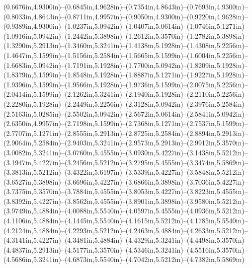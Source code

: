(0.6676in,4.9300in)--(0.6845in,4.9628in)--(0.7354in,4.8643in)--(0.7693in,4.9300in)--(0.8033in,4.8643in)--(0.8711in,4.9957in)--(0.9050in,4.9300in)--(0.9220in,4.9628in)--(0.9389in,4.9300in)--(1.0237in,5.0942in)--(1.0407in,5.0614in)--(1.0746in,5.1271in)--(1.0916in,5.0942in)--(1.2442in,5.3898in)--(1.2612in,5.3570in)--(1.2782in,5.3898in)--(1.3290in,5.2913in)--(1.3460in,5.3241in)--(1.4138in,5.1928in)--(1.4308in,5.2256in)--(1.4647in,5.1599in)--(1.5156in,5.2584in)--(1.5665in,5.1599in)--(1.6004in,5.2256in)--(1.6683in,5.0942in)--(1.7191in,5.1928in)--(1.7700in,5.0942in)--(1.8209in,5.1928in)--(1.8379in,5.1599in)--(1.8548in,5.1928in)--(1.8887in,5.1271in)--(1.9227in,5.1928in)--(1.9396in,5.1599in)--(1.9566in,5.1928in)--(1.9736in,5.1599in)--(2.0075in,5.2256in)--(2.0414in,5.1599in)--(2.1262in,5.3241in)--(2.1940in,5.1928in)--(2.2110in,5.2256in)--(2.2280in,5.1928in)--(2.2449in,5.2256in)--(2.3128in,5.0942in)--(2.3976in,5.2584in)--(2.5163in,5.0285in)--(2.5502in,5.0942in)--(2.5672in,5.0614in)--(2.5841in,5.0942in)--(2.6350in,4.9957in)--(2.7198in,5.1599in)--(2.7368in,5.1271in)--(2.7537in,5.1599in)--(2.7707in,5.1271in)--(2.8555in,5.2913in)--(2.8725in,5.2584in)--(2.8894in,5.2913in)--(2.9064in,5.2584in)--(2.9403in,5.3241in)--(2.9573in,5.2913in)--(2.9912in,5.3570in)--(3.0082in,5.3241in)--(3.0760in,5.4555in)--(3.0930in,5.4227in)--(3.1438in,5.5212in)--(3.1947in,5.4227in)--(3.2456in,5.5212in)--(3.2795in,5.4555in)--(3.3474in,5.5869in)--(3.3813in,5.5212in)--(3.4322in,5.6197in)--(3.5339in,5.4227in)--(3.5848in,5.5212in)--(3.6527in,5.3898in)--(3.6696in,5.4227in)--(3.6866in,5.3898in)--(3.7036in,5.4227in)--(3.7375in,5.3570in)--(3.7884in,5.4555in)--(3.8053in,5.4227in)--(3.8223in,5.4555in)--(3.8392in,5.4227in)--(3.8562in,5.4555in)--(3.8901in,5.3898in)--(3.9580in,5.5212in)--(3.9749in,5.4884in)--(4.0088in,5.5540in)--(4.0597in,5.4555in)--(4.0936in,5.5212in)--(4.1106in,5.4884in)--(4.1445in,5.5540in)--(4.1615in,5.5212in)--(4.1785in,5.5540in)--(4.2124in,5.4884in)--(4.2293in,5.5212in)--(4.2463in,5.4884in)--(4.2633in,5.5212in)--(4.3141in,5.4227in)--(4.3481in,5.4884in)--(4.4329in,5.3241in)--(4.4498in,5.3570in)--(4.4837in,5.2913in)--(4.5177in,5.3570in)--(4.5346in,5.3241in)--(4.5516in,5.3570in)--(4.5686in,5.3241in)--(4.6873in,5.5540in)--(4.7042in,5.5212in)--(4.7382in,5.5869in) 